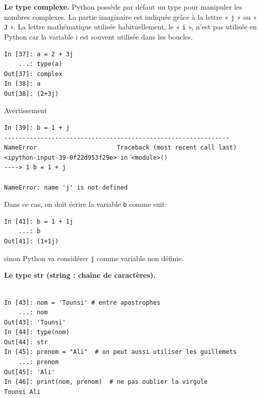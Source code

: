 \documentclass{beamer}
\begin{document}
\begin{frame}

\noindent\textbf{Le type complexe.}
Python possède par défaut un type pour manipuler les nombres complexes. La partie imaginaire est indiquée grâce à la lettre « \texttt{j} » ou « \texttt{J} ». La lettre mathématique utilisée habituellement, le « \texttt{i} », n’est pas utilisée en Python car la variable i est souvent utilisée dans les boucles.

\begin{verbatim}
In [37]: a = 2 + 3j
    ...: type(a)
Out[37]: complex
In [38]: a
Out[38]: (2+3j)
\end{verbatim}
\end{frame}

\begin{frame}

\begin{block}{Avertissement}
\begin{verbatim}
In [39]: b = 1 + j
--------------------------------------------------------------
NameError                      Traceback (most recent call last)
<ipython-input-39-0f22d953f29e> in <module>()
----> 1 b = 1 + j

NameError: name 'j' is not defined
\end{verbatim}
Dans ce cas, on doit écrire la variable \texttt{b} comme suit:
\begin{verbatim}
In [41]: b = 1 + 1j
    ...: b
Out[41]: (1+1j)
\end{verbatim}
sinon Python va considérer \texttt{j} comme variable non définie.
\end{block}
\end{frame}

\begin{frame}

\noindent\textbf{Le type str (string : chaîne de caractères).}
\begin{verbatim}

In [43]: nom = 'Tounsi' # entre apostrophes
    ...: nom
Out[43]: 'Tounsi'
In [44]: type(nom)
Out[44]: str
In [45]: prenom = "Ali"  # on peut aussi utiliser les guillemets
    ...: prenom
Out[45]: 'Ali'
In [46]: print(nom, prenom)  # ne pas oublier la virgule
Tounsi Ali
\end{verbatim}
\end{frame}
\end{document}
